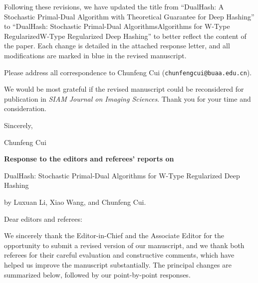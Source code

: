 \documentclass[11pt]{article}
\newcommand{\blue}[1]{{\ifmmode\color{blue}#1\else\normalfont\upshape\color{blue}#1\fi}}
\begin{document}
Following these revisions, we have updated the title from ``DualHash: A Stochastic Primal-Dual Algorithm with Theoretical Guarantee for Deep Hashing'' to ``DualHash: Stochastic Primal-Dual \blue{Algorithms} for \blue{W-Type Regularized} Deep Hashing'' to better reflect the content of the paper. Each change is detailed in the attached response letter, and all modifications are marked in blue in the revised manuscript.

\medskip
\noindent Please address all correspondence to Chunfeng Cui (\texttt{chunfengcui@buaa.edu.cn}).

\medskip
\noindent We would be most grateful if the revised manuscript could be reconsidered for publication in \emph{SIAM Journal on Imaging Sciences}. Thank you for your time and consideration.

\medskip
\noindent Sincerely,

\noindent Chunfeng Cui

\clearpage
\setcounter{page}{1}
\begin{center}
{\large\bfseries Response to the editors and referees' reports on\par}
\medskip
{\Large DualHash: Stochastic Primal-Dual Algorithms for W-Type Regularized Deep Hashing\par}
\medskip
by Luxuan Li, Xiao Wang, and Chunfeng Cui.
\end{center}

\medskip
\noindent Dear editors and referees:

\medskip
We sincerely thank the Editor-in-Chief and the Associate Editor for the opportunity to submit a revised version of our manuscript, and we thank both referees for their careful evaluation and constructive comments, which have helped us improve the manuscript substantially. The principal changes are summarized below, followed by our point-by-point responses.
\end{document}
